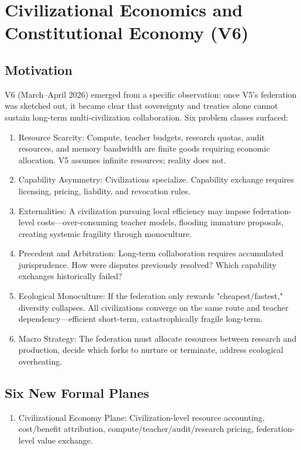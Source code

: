 \documentclass[12pt,a4paper]{article}
\begin{document}
\section{Civilizational Economics and Constitutional Economy (V6)}


\subsection{Motivation}


V6 (March--April 2026) emerged from a specific observation: once V5's federation was sketched out, it became clear that sovereignty and treaties alone cannot sustain long-term multi-civilization collaboration. Six problem classes surfaced:

\begin{enumerate}
  \item Resource Scarcity: Compute, teacher budgets, research quotas, audit resources, and memory bandwidth are finite goods requiring economic allocation. V5 assumes infinite resources; reality does not.
  \item Capability Asymmetry: Civilizations specialize. Capability exchange requires licensing, pricing, liability, and revocation rules.
  \item Externalities: A civilization pursuing local efficiency may impose federation-level costs---over-consuming teacher models, flooding immature proposals, creating systemic fragility through monoculture.
  \item Precedent and Arbitration: Long-term collaboration requires accumulated jurisprudence. How were disputes previously resolved? Which capability exchanges historically failed?
  \item Ecological Monoculture: If the federation only rewards "cheapest/fastest," diversity collapses. All civilizations converge on the same route and teacher dependency---efficient short-term, catastrophically fragile long-term.
  \item Macro Strategy: The federation must allocate resources between research and production, decide which forks to nurture or terminate, address ecological overheating.
\end{enumerate}

\subsection{Six New Formal Planes}


\begin{enumerate}
  \item Civilizational Economy Plane: Civilization-level resource accounting, cost/benefit attribution, compute/teacher/audit/research pricing, federation-level value exchange.
\end{enumerate}
\end{document}
